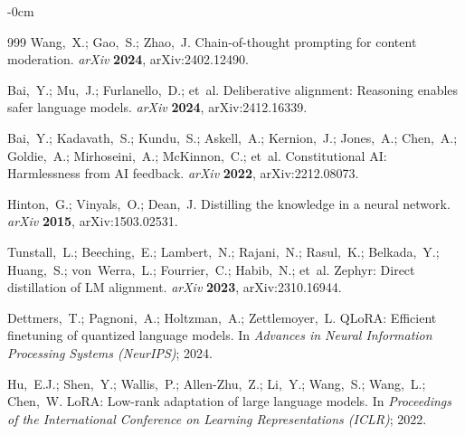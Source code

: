 \documentclass[ai,article,submit,pdftex,moreauthors]{Definitions/mdpi}
\begin{document}
\begin{adjustwidth}{-\extralength}{0cm}
{\begin{thebibliography}{999}
Wang,~X.; Gao,~S.; Zhao,~J.
Chain-of-thought prompting for content moderation.
{\em arXiv} {\bf 2024}, arXiv:2402.12490.

Bai,~Y.; Mu,~J.; Furlanello,~D.; et~al.
Deliberative alignment: Reasoning enables safer language models.
{\em arXiv} {\bf 2024}, arXiv:2412.16339.

Bai,~Y.; Kadavath,~S.; Kundu,~S.; Askell,~A.; Kernion,~J.; Jones,~A.; Chen,~A.; Goldie,~A.; Mirhoseini,~A.; McKinnon,~C.; et~al.
Constitutional {AI}: Harmlessness from {AI} feedback.
{\em arXiv} {\bf 2022}, arXiv:2212.08073.

Hinton,~G.; Vinyals,~O.; Dean,~J.
Distilling the knowledge in a neural network.
{\em arXiv} {\bf 2015}, arXiv:1503.02531.

Tunstall,~L.; Beeching,~E.; Lambert,~N.; Rajani,~N.; Rasul,~K.; Belkada,~Y.; Huang,~S.; von~Werra,~L.; Fourrier,~C.; Habib,~N.; et~al.
Zephyr: Direct distillation of {LM} alignment.
{\em arXiv} {\bf 2023}, arXiv:2310.16944.

Dettmers,~T.; Pagnoni,~A.; Holtzman,~A.; Zettlemoyer,~L.
{QLoRA}: Efficient finetuning of quantized language models.
In {\em Advances in Neural Information Processing Systems (NeurIPS)}; 2024.

Hu,~E.J.; Shen,~Y.; Wallis,~P.; Allen-Zhu,~Z.; Li,~Y.; Wang,~S.; Wang,~L.; Chen,~W.
{LoRA}: Low-rank adaptation of large language models.
In {\em Proceedings of the International Conference on Learning Representations (ICLR)}; 2022.

\end{thebibliography}
}

\PublishersNote{}
\end{adjustwidth}
\end{document}
